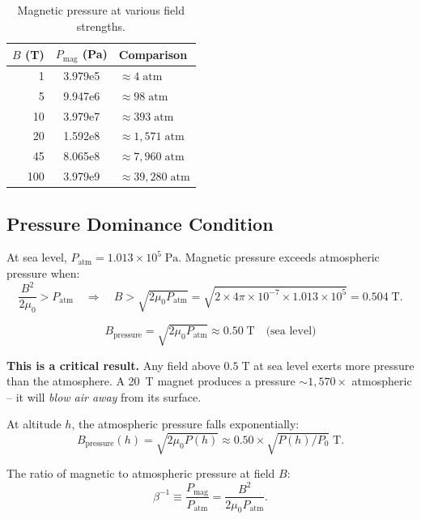 \documentclass[11pt,a4paper]{article}
\begin{document}
\begin{table}[h]
\centering
\caption{Magnetic pressure at various field strengths.}
\label{tab:magpressure}
\begin{tabular}{rSl}
\toprule
{$B$ (T)} & {$P_{\mathrm{mag}}$ (Pa)} & {Comparison} \\
    & 3.979e5    & $\approx 4\;\mathrm{atm}$ \\
5    & 9.947e6    & $\approx 98\;\mathrm{atm}$ \\
10   & 3.979e7    & $\approx 393\;\mathrm{atm}$ \\
20   & 1.592e8    & $\approx 1{,}571\;\mathrm{atm}$ \\
45   & 8.065e8    & $\approx 7{,}960\;\mathrm{atm}$ \\
100  & 3.979e9    & $\approx 39{,}280\;\mathrm{atm}$ \\
\bottomrule
\end{tabular}
\end{table}

\subsection{Pressure Dominance Condition}

At sea level, $P_{\mathrm{atm}} = 1.013 \times 10^5\;\mathrm{Pa}$.
Magnetic pressure exceeds atmospheric pressure when:
\begin{equation}
\frac{B^2}{2\mu_0} > P_{\mathrm{atm}}
\quad\Longrightarrow\quad
B > \sqrt{2\mu_0 P_{\mathrm{atm}}} = \sqrt{2 \times 4\pi \times 10^{-7}
\times 1.013 \times 10^5} = 0.504\;\mathrm{T}.
\end{equation}

\begin{equation}
\boxed{B_{\mathrm{pressure}} = \sqrt{2\mu_0 P_{\mathrm{atm}}} \approx 0.50\;\mathrm{T}
\quad\text{(sea level)}}
\end{equation}

\textbf{This is a critical result.} Any field above $0.5\;\mathrm{T}$ at sea level
exerts more pressure than the atmosphere. A 20~T magnet produces a pressure
$\sim 1{,}570\times$ atmospheric -- it will \emph{blow air away} from its surface.

At altitude $h$, the atmospheric pressure falls exponentially:
\begin{equation}
B_{\mathrm{pressure}}(h) = \sqrt{2\mu_0 P(h)} \approx 0.50 \times
\sqrt{P(h)/P_0}\;\mathrm{T}.
\end{equation}

The ratio of magnetic to atmospheric pressure at field $B$:
\begin{equation}\label{eq:beta}
\beta^{-1} \equiv \frac{P_{\mathrm{mag}}}{P_{\mathrm{atm}}} = \frac{B^2}{2\mu_0 P_{\mathrm{atm}}}.
\end{equation}
\end{document}

